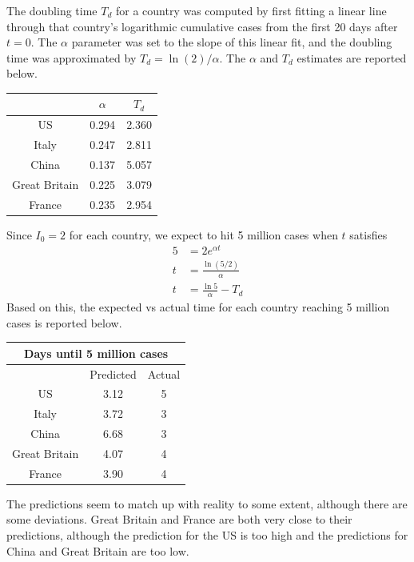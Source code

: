 \documentclass{article}
\begin{document}
The doubling time $T_d$ for a country was computed by first fitting a linear line through that country's logarithmic cumulative cases from the first 20 days after $t=0$. The $\alpha$ parameter was set to the slope of this linear fit, and the doubling time was approximated by $T_d = \ln(2)/\alpha$. The $\alpha$ and $T_d$ estimates are reported below.
\begin{center}
        \begin{tabular}{|c|c|c|}
                \hline
		& $\alpha$ & $T_d$ \\
                \hline
		US & 0.294 & 2.360 \\
		Italy & 0.247 & 2.811 \\
		China & 0.137 & 5.057 \\
		Great Britain & 0.225 & 3.079 \\
		France & 0.235 & 2.954 \\
                \hline
        \end{tabular}
\end{center}
Since $I_0 = 2$ for each country, we expect to hit 5 million cases when $t$ satisfies
\begin{align*}
	5 &= 2 e^{\alpha t} \\
	t &= \frac{\ln (5/2)}{\alpha} \\
	t &= \frac{\ln 5}{\alpha} - T_d
\end{align*}
Based on this, the expected vs actual time for each country reaching 5 million cases is reported below.
\begin{center}
        \begin{tabular}{|c|c|c|}
                \hline
		\multicolumn{3}{|c|}{Days until 5 million cases} \\
		\hline
		& Predicted & Actual \\
		\hline
		US & 3.12 & 5 \\
                Italy & 3.72 & 3 \\
                China & 6.68 & 3 \\
                Great Britain & 4.07 & 4 \\
                France & 3.90 & 4 \\
                \hline
        \end{tabular}
\end{center}
The predictions seem to match up with reality to some extent, although there are some deviations. Great Britain and France are both very close to their predictions, although the prediction for the US is too high and the predictions for China and Great Britain are too low.
\end{document}
